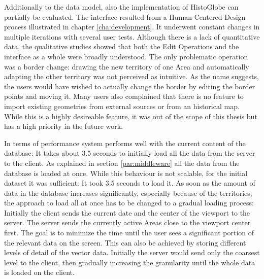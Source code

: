 Additionally to the data model, also the implementation of HistoGlobe can partially be evaluated. The interface resulted from a Human Centered Design process illustrated in chapter \ref{cha:development}. It underwent constant changes in multiple iterations with several user tests. Although there is a lack of quantitative data, the qualitative studies showed that both the Edit Operations and the interface as a whole were broadly understood. The only problematic operation was a border change: drawing the new territory of one Area and automatically adapting the other territory was not perceived as intuitive. As the name suggests, the users would have wished to actually change the border by editing the border points and moving it. Many users also complained that there is no feature to import existing geometries from external sources or from an historical map. While this is a highly desireable feature, it was out of the scope of this thesis but has a high priority in the future work.

In terms of performance system performs well with the current content of the database: It takes about 3.5 seconds to initially load all the data from the server to the client. As explained in section \ref{par:middleware}  all the data from the database is loaded at once. While this behaviour is not scalable, for the initial dataset it was sufficient: It took 3.5 seconds to load it. As soon as the amount of data in the database increases significantly, especially because of the territories, the approach to load all at once has to be changed to a gradual loading process: Initially the client sends the current date and the center of the viewport to the server. The server sends the currently active Areas close to the viewport center first. The goal is to minimize the time until the user sees a significant portion of the relevant data on the screen. This can also be achieved by storing different levels of detail of the vector data. Initially the server would send only the coarsest level to the client, then gradually increasing the granularity until the whole data is loaded on the client.

